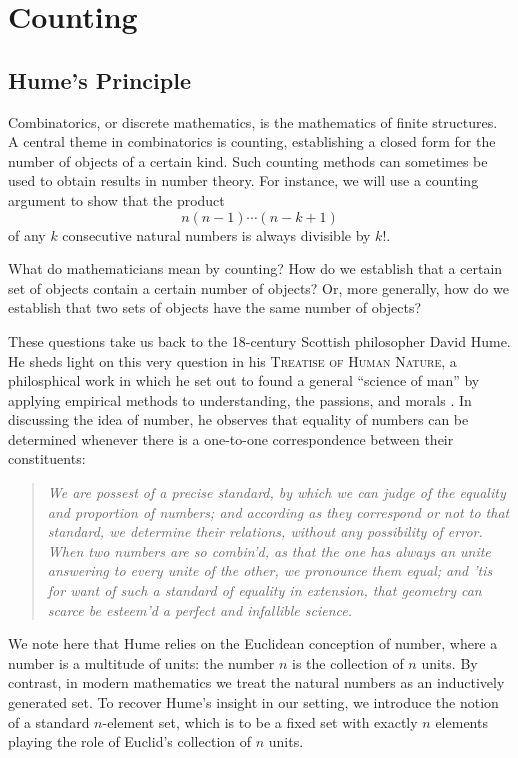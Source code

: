 \chapter{Counting}\label{chapter:combinatorial-methods}

\section{Hume's Principle}

Combinatorics, or discrete mathematics,
is the mathematics of finite structures.
A central theme in combinatorics is counting,
establishing a closed form for the number of objects of a certain kind.
Such counting methods can sometimes be used to obtain results in number theory.
For instance, we will use a counting argument to show that the product
\begin{equation*}
  n(n-1)\cdots(n-k+1)
\end{equation*}
of any $k$ consecutive natural numbers is always divisible by $k!$.

What do mathematicians mean by counting? How do we establish that a certain set of objects contain a certain number of objects? Or, more generally, how do we establish that two sets of objects have the same number of objects?

These questions take us back to the 18\supth{}-century Scottish philosopher David Hume. He sheds light on this very question in his \textsc{Treatise of Human Nature},
a philosphical work in which he set out to found a general ``science of man'' by applying empirical methods to understanding, the passions, and morals \cite[Part III, Book I]{hume1978}.
In discussing the idea of number, he observes that equality of numbers can be determined whenever there is a one-to-one correspondence between their constituents:
\begin{quote}
  {\itshape We are possest of a precise standard, by which we can judge
    of the equality and proportion of numbers; and according as they correspond
    or not to that standard, we determine their relations, without any
    possibility of error. When two numbers are so combin'd, as that the one has
    always an unite answering to every unite of the other, we pronounce them
    equal; and 'tis for want of such a standard of equality in extension, that
    geometry can scarce be esteem'd a perfect and infallible science.}
\end{quote}
We note here that Hume relies on the Euclidean conception of number,
where a number is a multitude of units:
the number $n$ is the collection of $n$ units.
By contrast,
in modern mathematics we treat the natural numbers as an inductively generated set.
To recover Hume's insight in our setting,
we introduce the notion of a standard $n$-element set,
which is to be a fixed set with exactly $n$ elements playing the role of Euclid's collection of $n$ units.

